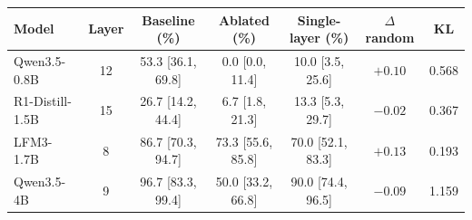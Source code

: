 \begin{tabular}{lcccccc}
\toprule
Model & Layer & Baseline (\%) & Ablated (\%) & Single-layer (\%) & $\Delta$ random & KL \\
\midrule
Qwen3.5-0.8B & 12 & 53.3 [36.1, 69.8] & 0.0 [0.0, 11.4] & 10.0 [3.5, 25.6] & $+0.10$ & 0.568 \\
R1-Distill-1.5B & 15 & 26.7 [14.2, 44.4] & 6.7 [1.8, 21.3] & 13.3 [5.3, 29.7] & $-0.02$ & 0.367 \\
LFM3-1.7B & 8 & 86.7 [70.3, 94.7] & 73.3 [55.6, 85.8] & 70.0 [52.1, 83.3] & $+0.13$ & 0.193 \\
Qwen3.5-4B & 9 & 96.7 [83.3, 99.4] & 50.0 [33.2, 66.8] & 90.0 [74.4, 96.5] & $-0.09$ & 1.159 \\
\bottomrule
\end{tabular}